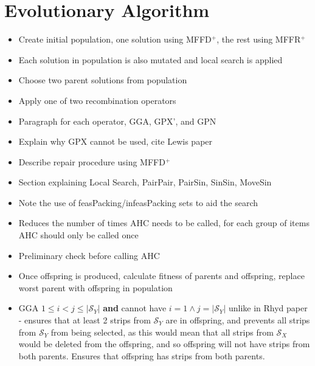 \documentclass{elsarticle}
\begin{document}
\section{Evolutionary Algorithm}
\begin{itemize}
	\item Create initial population, one solution using MFFD$^+$, the rest using MFFR$^+$
	\item Each solution in population is also mutated and local search is applied
	\item Choose two parent solutions from population
	\item Apply one of two recombination operators
	\item Paragraph for each operator, GGA, GPX', and GPN
	\item Explain why GPX cannot be used, cite Lewis paper
	\item Describe repair procedure using MFFD$^+$
	\item Section explaining Local Search, PairPair, PairSin, SinSin, MoveSin
	\item Note the use of feasPacking/infeasPacking sets to aid the search
	\item Reduces the number of times AHC needs to be called, for each group of items AHC should only be called once
	\item Preliminary check before calling AHC
	\item Once offspring is produced, calculate fitness of parents and offspring, replace worst parent with offspring in population
	\item GGA $1 \leq i < j \leq |\mathcal{S}_Y|$ \textbf{and} cannot have $i = 1 \land j = |\mathcal{S}_Y|$ unlike in Rhyd paper - ensures that at least 2 strips from $\mathcal{S}_Y$ are in offspring, and prevents all strips from $\mathcal{S}_Y$ from being selected, as this would mean that all strips from $\mathcal{S}_X$ would be deleted from the offspring, and so offspring will not have strips from both parents. Ensures that offspring has strips from both parents.
	

\end{itemize}
\end{document}
